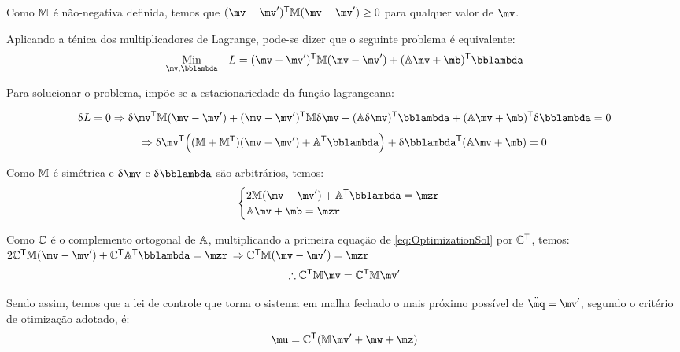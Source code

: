 Como $\mathbb{M}$ \'e n\~ao-negativa definida, temos que $(\mv - \mv')^\msT \mM (\mv - \mv') \geq 0 $ para qualquer valor de $\mv$.

Aplicando a t\'enica dos multiplicadores de Lagrange, pode-se dizer que o seguinte problema \'e equivalente:
\begin{equation}
\begin{aligned}
& \underset{\mv, \mlambda}{\text{Min}}
& & L = (\mv - \mv')^\msT \mM (\mv - \mv') + (\mA \mv + \mb)^\msT \mlambda \\
\end{aligned}
\end{equation}


Para solucionar o problema, imp\~oe-se a estacionariedade da fun\c{c}\~ao lagrangeana:

$$ \dl L = 0 \Rightarrow \dl \mv^\msT \mM (\mv - \mv') + (\mv - \mv')^\msT \mM \dl \mv + (\mA \dl \mv)^\msT \mlambda + (\mA \mv + \mb)^\msT \dl \mlambda = 0 $$
$$ \Rightarrow \dl \mv^\msT \Big( (\mM + \mM^\msT)(\mv - \mv') + \mA^\msT \mlambda \Big) + \dl \mlambda^\msT (\mA \mv + \mb) = 0 $$

Como $\mathbb{M}$ \'e sim\'etrica e $\dl \mv$ e $\dl \mlambda$ s\~ao arbitr\'arios, temos:
\begin{equation} \label{eq:OptimizationSol}
\begin{cases}
2 \mM (\mv - \mv') + \mA^\msT \mlambda = \mzr \\
\mA \mv + \mb = \mzr
\end{cases}
\end{equation}

Como $\mathbb{C}$ \'e o complemento ortogonal de $\mathbb{A}$, multiplicando a primeira equa\c{c}\~ao de \eqref{eq:OptimizationSol} por $\mathbb{C}^{\mathsf{T}}$, temos: \\

$ 2 \mC^\msT \mM (\mv - \mv') + \mC^\msT \mA^\msT \mlambda = \mzr $
$ \Rightarrow  \mC^\msT \mM (\mv - \mv')  = \mzr $
\begin{equation} \label{eq:OptimizationSol2}
\therefore \mC^\msT \mM \mv  = \mC^\msT \mM  \mv'
\end{equation}

Sendo assim, temos que a lei de controle que torna o sistema em malha fechado o mais pr\'oximo poss\'ivel de $\ddot{\mq} = \mv'$, segundo o crit\'erio de otimiza\c{c}\~ao adotado, \'e:
\begin{equation} \label{eq:ControlLawFinal}
\mu = \mC^\msT ( \mM \mv' + \mw + \mz )
\end{equation}

